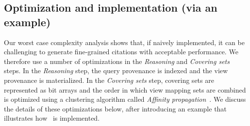 \subsection{Optimization and implementation (via an example)}
Our worst case complexity analysis shows that, if naively implemented, it can be challenging to generate fine-grained citations with acceptable performance. We therefore use a number of optimizations in the {\em Reasoning} and {\em Covering sets} steps. In the {\em Reasoning} step, the query provenance is indexed and the view provenance is materialized. In the {\em Covering sets} step, covering sets are represented as bit arrays and the order in which view mapping sets are combined is optimized using a clustering algorithm called {\em Affinity propagation}~\cite{dueck2007non}. We discuss the details of these optimizations below, after introducing an example that illustrates how \provalg\ is implemented. 
